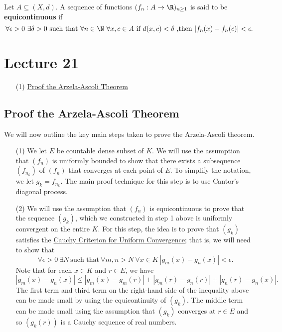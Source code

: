 \begin{definition}\label{Equicontinuous sequence of functions}
    Let \( A \subseteq (X,d) \). A sequence of functions \( ({f}_{n} : A \to \R)_{n \geq 1} \) is said to be \textbf{equicontinuous} if 
    \[  \forall \epsilon > 0 \ \exists \delta > 0 \ \text{such that} \ \forall n \in \N \ \forall x,c \in A \ \text{if} \ d(x,c) < \delta \ \text{,then} \ | {f}_{n}(x) - {f}_{n}(c) |  < \epsilon. \]
\end{definition}


\section{Lecture 21}

\begin{enumerate}
    \item[(1)] {\hyperref[Proof the Arzela-Ascoli Theorem]{Proof the Arzela-Ascoli Theorem}}
\end{enumerate}


\subsection{Proof the Arzela-Ascoli Theorem}\label{Proof the Arzela-Ascoli Theorem}

We will now outline the key main steps taken to prove the Arzela-Ascoli theorem. 

\begin{enumerate}
\item[(1)] We let \( E  \) be countable dense subset of \( K   \). We will use the assumption that \( ({f}_{n}) \) is uniformly bounded to show that there exists a subsequence \( ({f}_{{n}_{k }}) \) of \( ({f}_{n}) \) that converges at each point of \( E  \). To simplify the notation, we let \( {g}_{k } = {f}_{{n}_{k }} \). The main proof technique for this step is to use Cantor's diagonal process. 
\item[(2)] We will use the assumption that \( ({f}_{n}) \) is equicontinuous to prove that the sequence \( ({g}_{k}) \), which we constructed in step 1 above is uniformly convergent on the entire \(  K  \). For this step, the idea is to prove that \( ({g}_{k}) \) satisfies the {\hyperref[Cauchy Criterion for Uniform Convergence]{Cauchy Criterion for Uniform Convergence}}; that is, we will need to show that 
    \[  \forall \epsilon > 0 \ \exists N \ \text{such that} \ \forall m,n > N \ \forall x \in K \ | {g}_{m}(x) - {g}_{n}(x) | < \epsilon. \]
    Note that for each \( x \in K  \) and \( r \in E  \), we have 
    \[  | {g}_{m}(x) - {g}_{n}(x) | \leq | {g}_{m}(x) - {g}_{m}(r) | + | {g}_{m}(r) - {g}_{n}(r)  |  + | {g}_{n}(r) - {g}_{n}(x) |. \]
    The first term and third term on the right-hand side of the inequality above can be made small by using the equicontinuity of \( ({g}_{k}) \). The middle term can be made small using the assumption that \( ({g}_{k}) \) converges at \( r \in E  \) and so \( ({g}_{k }(r)) \) is a Cauchy sequence of real numbers.
\end{enumerate}

